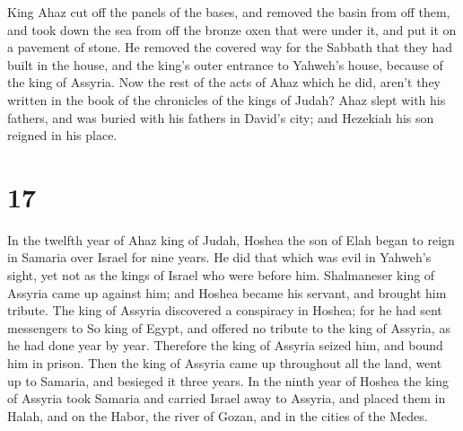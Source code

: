  King Ahaz cut off the panels of the bases, and removed
the basin from off them, and took down the sea from off the bronze oxen
that were under it, and put it on a pavement of stone. 
He removed the covered way for the Sabbath that they had built in the
house, and the king's outer entrance to Yahweh's house, because of the
king of Assyria.  Now the rest of the acts of Ahaz which
he did, aren't they written in the book of the chronicles of the kings
of Judah?  Ahaz slept with his fathers, and was buried
with his fathers in David's city; and Hezekiah his son reigned in his
place.

\hypertarget{section-16}{%
\section{17}\label{section-16}}

 In the twelfth year of Ahaz king of Judah, Hoshea the son
of Elah began to reign in Samaria over Israel for nine years.
 He did that which was evil in Yahweh's sight, yet not as
the kings of Israel who were before him.  Shalmaneser king
of Assyria came up against him; and Hoshea became his servant, and
brought him tribute.  The king of Assyria discovered a
conspiracy in Hoshea; for he had sent messengers to So king of Egypt,
and offered no tribute to the king of Assyria, as he had done year by
year. Therefore the king of Assyria seized him, and bound him in prison.
 Then the king of Assyria came up throughout all the land,
went up to Samaria, and besieged it three years.  In the
ninth year of Hoshea the king of Assyria took Samaria and carried Israel
away to Assyria, and placed them in Halah, and on the Habor, the river
of Gozan, and in the cities of the Medes.

